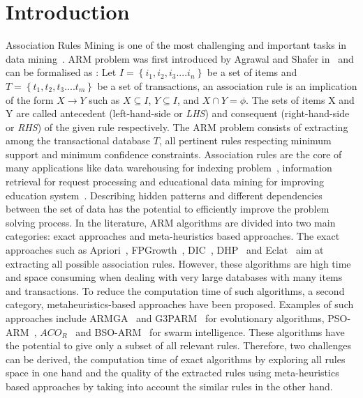 \documentclass[preprint,12pt]{elsarticle}
\begin{document}
\section{Introduction}
 Association Rules Mining is one of the most challenging and important tasks in data mining~\cite{1}. 
 ARM problem was first introduced by Agrawal and Shafer in~\cite{2} and can be formalised as :
 Let $I=\left\{i_{1},i_{2},i_{3}....i_{n}\right\}$ be a set of items and $T =\left\{t_{1},t_{2},t_{3}....t_{m}\right\}$ be a set of transactions, 
 an association rule is an implication of the form 
 $X \rightarrow Y$ such as $X \subseteq  I$, $Y \subseteq I$, and $X \cap Y = \phi$. 
The sets of items X and Y are called antecedent (left-hand-side or \textit{LHS}) and consequent (right-hand-side or \textit{RHS}) of the given rule 
respectively. The ARM problem consists of extracting among the transactional database $T$, 
all pertinent rules respecting minimum support and minimum confidence constraints. Association rules are the core of many applications like data warehousing for indexing problem~\cite{3},
information retrieval for request processing and educational data mining for improving education system~\cite{4}. Describing hidden patterns 
and different dependencies between the set of data has the potential to efficiently improve
the problem solving process. In the literature, ARM algorithms are divided into two main categories: exact approaches and 
meta-heuristics based approaches. The exact approaches such as Apriori~\cite{5}, FPGrowth~\cite{6}, DIC~\cite{7}, DHP~\cite{8} and Eclat~\cite{9} aim at extracting all possible association rules. However, these algorithms are high time and space consuming when dealing with very large databases with many items and transactions. 
To reduce the computation time of such algorithms, a second category, metaheuristics-based approaches have been proposed. Examples of such approaches include ARMGA~\cite{10} and G3PARM~\cite{11} for evolutionary algorithms, PSO-ARM~\cite{12}, $ACO_R$~\cite{13} and BSO-ARM~\cite{14} 
for swarm intelligence. These algorithms have the potential to give only a subset of all relevant rules. Therefore, two challenges can be derived, the computation time of exact algorithms by exploring all rules space in one hand and the quality of the extracted rules using meta-heuristics based approaches by taking into account the similar rules in the other hand. \\
\end{document}
